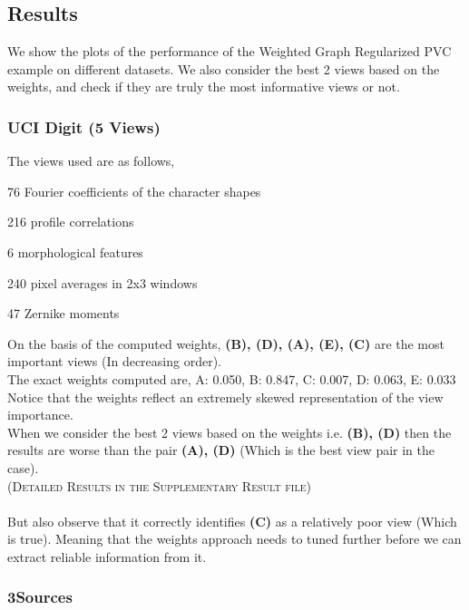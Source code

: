 \documentclass[a4paper]{article}
\begin{document}
	\subsection{Results}

	We show the plots of the performance of the Weighted Graph Regularized PVC example on different datasets. We also consider the best 2 views based on the weights, and check if they are truly the most informative views or not.	
	
	\subsubsection{UCI Digit (5 Views)}

	The views used are as follows,
	\vspace{-0.2cm}
	\begin{enumerate}[(A)]
	\setlength\itemsep{-0.05em}
	{
		\item 76 Fourier coefficients of the character shapes
		\item 216 profile correlations
		\item 6 morphological features
		\item 240 pixel averages in 2x3 windows 
		\item 47 Zernike moments
	}\end{enumerate}		

	On the basis of the computed weights, \textbf{(B), (D), (A), (E), (C)} are the most important views (In decreasing order).\\
	The exact weights computed are,	\textsc{A: 0.050, B: 0.847, C: 0.007, D: 0.063, E: 0.033}\\
	Notice that the weights reflect an extremely skewed representation of the view importance. \\
	When we consider the best 2 views based on the weights i.e. \textbf{(B), (D)} then the results are worse than the pair \textbf{(A), (D)} (Which is the best view pair in the case).\\
	\null \hfill {\footnotesize{\textsc{(Detailed Results in the Supplementary Result file)}}}\\\\
	But also observe that it correctly identifies \textbf{(C)} as a relatively poor view (Which is true). Meaning that the weights approach needs to tuned further before we can extract reliable information from it.

	\subsubsection{3Sources}
	
\end{document}

